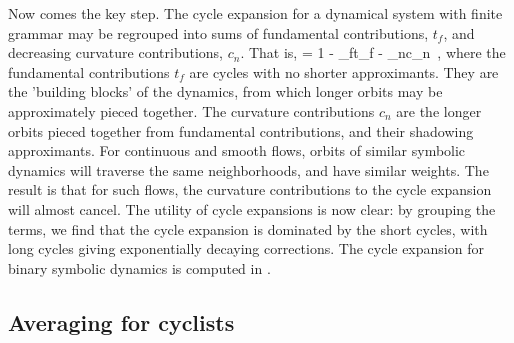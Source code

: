 \documentclass[aps,pre,
                showpacs,
                twocolumn,
                groupedaddress,
                superscriptaddress,
                floatfix]{revtex4-1}
\begin{document}
Now comes the key step. The cycle expansion for a dynamical system with
finite grammar may be regrouped into sums of fundamental contributions,
$t_{f}$, and decreasing curvature contributions, $c_{n}$. That is,
\beq
{} = 1 - \sum_{f}t_{f} - \sum_{n}c_{n}
\,,
where the fundamental contributions $t_{f}$ are cycles with no shorter
approximants. They are the 'building blocks' of the dynamics, from which
longer orbits may be approximately pieced together. The curvature
contributions $c_{n}$ are the longer orbits pieced together from
fundamental contributions, and their shadowing approximants. For
continuous and smooth flows, orbits of similar symbolic dynamics will
traverse the same neighborhoods, and have similar weights. The result is
that for such flows, the curvature contributions to the cycle expansion
will almost cancel. The utility of cycle expansions is now clear: by
grouping the terms, we find that the cycle expansion is dominated by the
short cycles, with long cycles giving exponentially decaying corrections.
The cycle expansion for binary symbolic dynamics is computed in
.

\subsection{Averaging for cyclists}
\label{sect:AverCycl}
\end{document}
